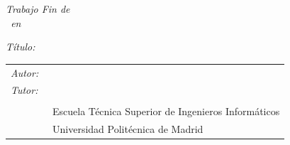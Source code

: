 \begin{titlepage}
\vspace*{4cm}

\noindent
\textit{Trabajo Fin de \Estudios}\\
\textit{\Estudios\ en \TituloEstudios}

\begin{minipage}[t]{0.1\linewidth}
  \textit{Título:}
\end{minipage}
\begin{minipage}[t]{0.88\linewidth}
  \TituloTFG
\end{minipage}

\Fecha

\vspace*{4cm}

\noindent
\begin{tabular}{lp{0.85\linewidth}}
  \textit{Autor:} & \NombreAutor{}  \\
  \textit{Tutor:} & \NombreTutor{}  \\
                  & \Departamento{} \\
                  & Escuela Técnica Superior de Ingenieros Informáticos\\
                  & Universidad Politécnica de Madrid
\end{tabular}
\end{titlepage}
